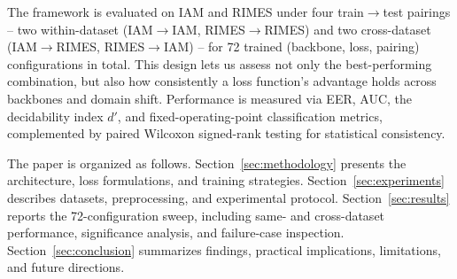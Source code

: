 The framework is evaluated on IAM\cite{iam} and RIMES\cite{rimes} under four train$\to$test pairings -- two within-dataset (IAM$\to$IAM, RIMES$\to$RIMES) and two cross-dataset (IAM$\to$RIMES, RIMES$\to$IAM) -- for 72 trained (backbone, loss, pairing) configurations in total. This design lets us assess not only the best-performing combination, but also how consistently a loss function's advantage holds across backbones and domain shift. Performance is measured via EER, AUC, the decidability index $d'$, and fixed-operating-point classification metrics, complemented by paired Wilcoxon signed-rank testing for statistical consistency.

The paper is organized as follows. Section~\ref{sec:methodology} presents the architecture, loss formulations, and training strategies. Section~\ref{sec:experiments} describes datasets, preprocessing, and experimental protocol. Section~\ref{sec:results} reports the 72-configuration sweep, including same- and cross-dataset performance, significance analysis, and failure-case inspection. Section~\ref{sec:conclusion} summarizes findings, practical implications, limitations, and future directions.